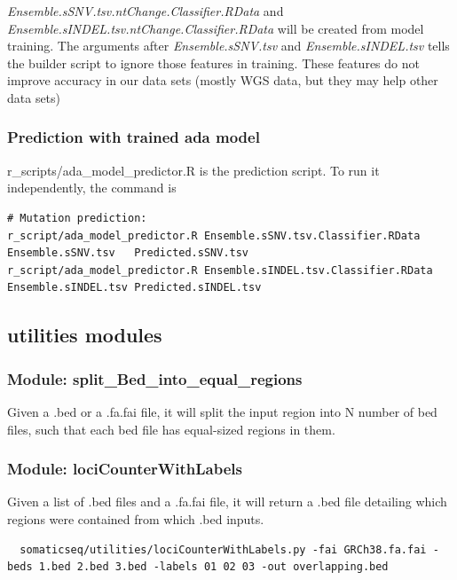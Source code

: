 \documentclass[10pt,letterpaper]{article}
\begin{document}
\begin{sloppypar}
\textit{Ensemble.sSNV.tsv.ntChange.Classifier.RData} and \textit{Ensemble.sINDEL.tsv.ntChange.Classifier.RData} will be created from model training. The arguments after \textit{Ensemble.sSNV.tsv} and \textit{Ensemble.sINDEL.tsv} tells the builder script to ignore those features in training. These features do not improve accuracy in our data sets (mostly WGS data, but they may help other data sets)


\subsubsection{Prediction with trained ada model} \label{module:r_predict}

r\_scripts/ada\_model\_predictor.R is the prediction script. To run it independently, the command is
      
\begin{lstlisting}
# Mutation prediction:
r_script/ada_model_predictor.R Ensemble.sSNV.tsv.Classifier.RData   Ensemble.sSNV.tsv   Predicted.sSNV.tsv
r_script/ada_model_predictor.R Ensemble.sINDEL.tsv.Classifier.RData Ensemble.sINDEL.tsv Predicted.sINDEL.tsv
\end{lstlisting}






\subsection{utilities modules} \label{module:utilities}

\subsubsection{Module: split\_Bed\_into\_equal\_regions} \label{module:split_bed}

Given a .bed or a .fa.fai file, it will split the input region into N number of bed files, such that each bed file has equal-sized regions in them. 


\subsubsection{Module: lociCounterWithLabels}

Given a list of .bed files and a .fa.fai file, it will return a .bed file detailing which regions were contained from which .bed inputs. 

\begin{lstlisting}
  somaticseq/utilities/lociCounterWithLabels.py -fai GRCh38.fa.fai -beds 1.bed 2.bed 3.bed -labels 01 02 03 -out overlapping.bed
\end{lstlisting}


\end{sloppypar}
\end{document}
